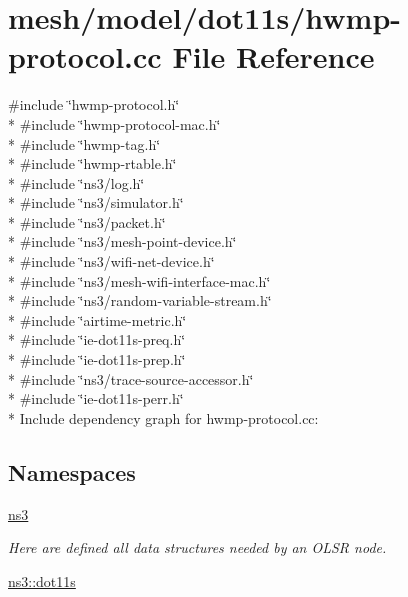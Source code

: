 \hypertarget{hwmp-protocol_8cc}{}\section{mesh/model/dot11s/hwmp-\/protocol.cc File Reference}
\label{hwmp-protocol_8cc}
{\ttfamily \#include \char`\"{}hwmp-\/protocol.\+h\char`\"{}}\\*
{\ttfamily \#include \char`\"{}hwmp-\/protocol-\/mac.\+h\char`\"{}}\\*
{\ttfamily \#include \char`\"{}hwmp-\/tag.\+h\char`\"{}}\\*
{\ttfamily \#include \char`\"{}hwmp-\/rtable.\+h\char`\"{}}\\*
{\ttfamily \#include \char`\"{}ns3/log.\+h\char`\"{}}\\*
{\ttfamily \#include \char`\"{}ns3/simulator.\+h\char`\"{}}\\*
{\ttfamily \#include \char`\"{}ns3/packet.\+h\char`\"{}}\\*
{\ttfamily \#include \char`\"{}ns3/mesh-\/point-\/device.\+h\char`\"{}}\\*
{\ttfamily \#include \char`\"{}ns3/wifi-\/net-\/device.\+h\char`\"{}}\\*
{\ttfamily \#include \char`\"{}ns3/mesh-\/wifi-\/interface-\/mac.\+h\char`\"{}}\\*
{\ttfamily \#include \char`\"{}ns3/random-\/variable-\/stream.\+h\char`\"{}}\\*
{\ttfamily \#include \char`\"{}airtime-\/metric.\+h\char`\"{}}\\*
{\ttfamily \#include \char`\"{}ie-\/dot11s-\/preq.\+h\char`\"{}}\\*
{\ttfamily \#include \char`\"{}ie-\/dot11s-\/prep.\+h\char`\"{}}\\*
{\ttfamily \#include \char`\"{}ns3/trace-\/source-\/accessor.\+h\char`\"{}}\\*
{\ttfamily \#include \char`\"{}ie-\/dot11s-\/perr.\+h\char`\"{}}\\*
Include dependency graph for hwmp-\/protocol.cc\+:
\subsection*{Namespaces}
\begin{DoxyCompactItemize}
\item 
 \hyperlink{namespacens3}{ns3}
\begin{DoxyCompactList}\small\item\em Here are defined all data structures needed by an O\+L\+SR node. \end{DoxyCompactList}\item 
 \hyperlink{namespacens3_1_1dot11s}{ns3\+::dot11s}
\end{DoxyCompactItemize}
